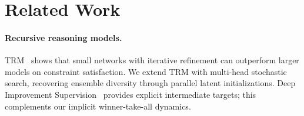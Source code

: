 \section{Related Work}


\paragraph{Recursive reasoning models.}
TRM~\citep{jolicoeur2025trm} shows that small networks with iterative refinement
can outperform larger models on constraint satisfaction. We extend TRM with
multi-head stochastic search, recovering ensemble diversity through parallel
latent initializations. Deep Improvement Supervision~\citep{dis2025} provides
explicit intermediate targets; this complements our implicit winner-take-all dynamics.


